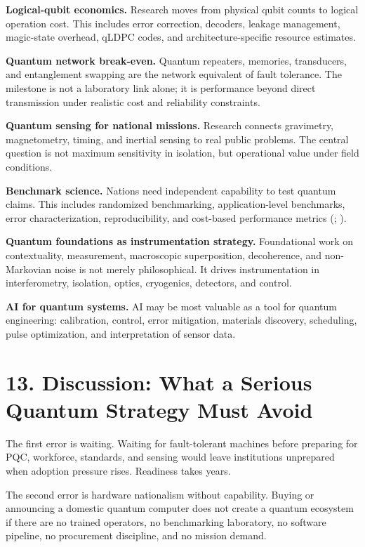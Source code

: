 \documentclass[
  11pt,
  letterpaper,
]{article}
\begin{document}
\textbf{Logical-qubit economics.} Research moves from physical qubit
counts to logical operation cost. This includes error correction,
decoders, leakage management, magic-state overhead, qLDPC codes, and
architecture-specific resource estimates.

\textbf{Quantum network break-even.} Quantum repeaters, memories,
transducers, and entanglement swapping are the network equivalent of
fault tolerance. The milestone is not a laboratory link alone; it is
performance beyond direct transmission under realistic cost and
reliability constraints.

\textbf{Quantum sensing for national missions.} Research connects
gravimetry, magnetometry, timing, and inertial sensing to real public
problems. The central question is not maximum sensitivity in isolation,
but operational value under field conditions.

\textbf{Benchmark science.} Nations need independent capability to test
quantum claims. This includes randomized benchmarking, application-level
benchmarks, error characterization, reproducibility, and cost-based
performance metrics (;
).

\textbf{Quantum foundations as instrumentation strategy.} Foundational
work on contextuality, measurement, macroscopic superposition,
decoherence, and non-Markovian noise is not merely philosophical. It
drives instrumentation in interferometry, isolation, optics, cryogenics,
detectors, and control.

\textbf{AI for quantum systems.} AI may be most valuable as a tool for
quantum engineering: calibration, control, error mitigation, materials
discovery, scheduling, pulse optimization, and interpretation of sensor
data.

\section{13. Discussion: What a Serious Quantum Strategy Must
Avoid}\label{discussion-what-a-serious-quantum-strategy-must-avoid}

The first error is waiting. Waiting for fault-tolerant machines before
preparing for PQC, workforce, standards, and sensing would leave
institutions unprepared when adoption pressure rises. Readiness takes
years.

The second error is hardware nationalism without capability. Buying or
announcing a domestic quantum computer does not create a quantum
ecosystem if there are no trained operators, no benchmarking laboratory,
no software pipeline, no procurement discipline, and no mission demand.
\end{document}
